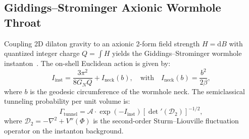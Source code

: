 \documentclass[11pt,a4paper,reqno]{article}
\theoremstyle{plain}
\theoremstyle{definition}
\theoremstyle{remark}
\numberwithin{equation}{section}
\newcommand{\diff}{\mathrm{d}}
\begin{document}
\subsection{Giddings--Strominger Axionic Wormhole Throat}
Coupling 2D dilaton gravity to an axionic 2-form field strength $H = \diff B$ with quantized integer charge $Q = \int H$ yields the Giddings--Strominger wormhole instanton~\cite{GiddingsStrominger1988}. The on-shell Euclidean action is given by:
\begin{equation}
  I_{\mathrm{inst}} = \frac{3\pi^2}{8 G_N Q} + I_{\mathrm{neck}}(b), \quad \mathrm{with} \quad I_{\mathrm{neck}}(b) = \frac{b^2}{2\beta},
  \label{eq:instanton_action}
\end{equation}
where $b$ is the geodesic circumference of the wormhole neck. The semiclassical tunneling probability per unit volume is:
\begin{equation}
  \Gamma_{\mathrm{tunnel}} = \mathcal{A} \cdot \exp\left( - I_{\mathrm{inst}} \right) \left[ \det\nolimits'(\mathcal{D}_2) \right]^{-1/2},
\end{equation}
where $\mathcal{D}_2 = -\nabla^2 + V''(\Phi)$ is the second-order Sturm--Liouville fluctuation operator on the instanton background.
\end{document}
